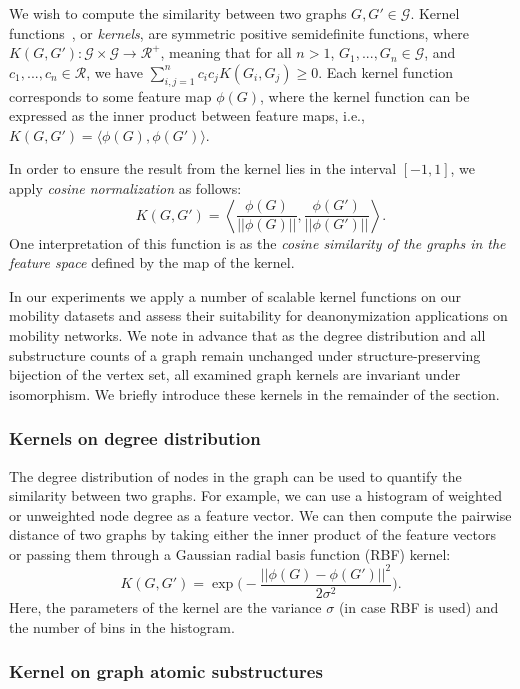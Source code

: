 We wish to compute the similarity between two graphs $ G, G' \in \mathcal{G} $. Kernel functions~\cite{Vishwanathan2010}, or \emph{kernels}, are symmetric positive semidefinite functions, where  $ K(G, G') : \mathcal{G} \times \mathcal{G} \rightarrow \mathcal{R}^{+} $, meaning
that for all $ n > 1 $,  $ G_1, . . . , G_n \in \mathcal{G} $, and $ c_1, . . . , c_n \in \mathcal{R}$, we have $ {\sum_{i,j=1}^{n} c_ic_jK(G_i, G_j ) \geq 0} $.
Each kernel function corresponds to some feature map $ \phi(G) $, where the
kernel function can be expressed as the inner product between feature maps, i.e., $ K(G, G') = \big \langle \phi(G), \phi(G') \big \rangle $.

In order to ensure the result from the kernel lies in the interval $[-1, 1]$, we apply \emph{cosine normalization} as follows:
\[
K({G}, {G}')=\left  \langle \frac{\phi({G})}{||\phi({G})||}, \frac{\phi(G')}{||\phi(G')||} \right  \rangle.
\]
One interpretation of this function is as the \emph{cosine similarity of the graphs in the feature space} defined by the map of the kernel.

In our experiments we apply a number of scalable kernel functions on our mobility datasets and assess their suitability for deanonymization applications on mobility networks.
We note in advance that as the degree distribution and all substructure counts of a graph remain unchanged under structure-preserving bijection of the vertex set, all examined graph kernels are invariant under isomorphism.
We briefly introduce these kernels in the remainder of the section.




\subsubsection{Kernels on degree distribution }

The degree distribution of nodes in the graph can be used to quantify the similarity between two graphs.
For example, we can use a histogram of weighted or unweighted node degree as a feature vector.
We can then compute the pairwise distance of two graphs by taking either the inner product of the feature vectors or passing them through a Gaussian radial basis function (RBF) kernel:
\[ K(G,G') =\exp\bigg( -\frac{||\phi(G) - \phi(G')||^2}{2\sigma^2} \bigg).\]
Here, the parameters of the kernel are the variance $ \sigma $ (in case RBF is used) and the number of bins in the histogram.

\subsubsection{Kernel on graph atomic substructures}

